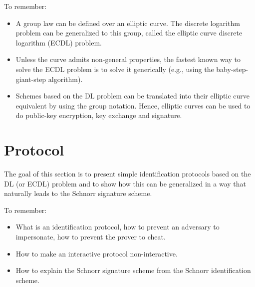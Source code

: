 \documentclass[11pt,a4paper]{report}
\begin{document}
To remember:
\begin{itemize}
\item A group law can be defined over an elliptic curve. The discrete logarithm problem can be generalized to this group, called the elliptic curve discrete logarithm (ECDL) problem.
\item Unless the curve admits non-general properties, the fastest known way to solve the ECDL problem is to solve it generically (e.g., using the baby-step-giant-step algorithm).
\item Schemes based on the DL problem can be translated into their elliptic curve equivalent by using the group notation. Hence, elliptic curves can be used to do public-key encryption, key exchange and signature.
\end{itemize}


\section{Protocol}
The goal of this section is to present simple identification protocols based on the DL (or ECDL) problem and to show how this can be generalized in a way that naturally leads to the Schnorr signature scheme.

To remember:
\begin{itemize}
\item What is an identification protocol, how to prevent an adversary to impersonate, how to prevent the prover to cheat.
\item How to make an interactive protocol non-interactive.
\item How to explain the Schnorr signature scheme from the Schnorr identification scheme.
\end{itemize}
\end{document}
